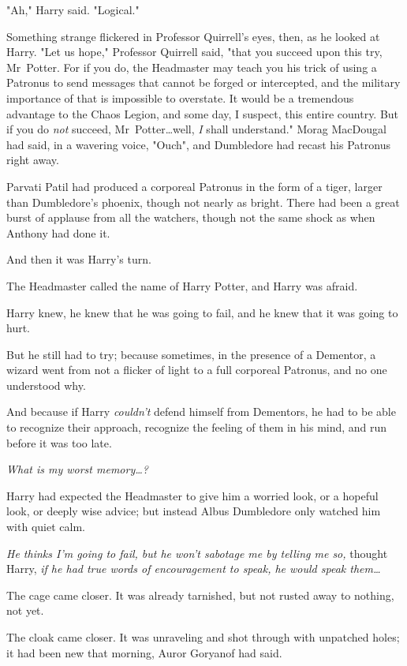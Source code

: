 "Ah," Harry said. "Logical."

Something strange flickered in Professor Quirrell's eyes, then, as he looked at
Harry. "Let us hope," Professor Quirrell said, "that you succeed upon this try,
Mr~Potter. For if you do, the Headmaster may teach you his trick of using a
Patronus to send messages that cannot be forged or intercepted, and the
military importance of that is impossible to overstate. It would be a
tremendous advantage to the Chaos Legion, and some day, I suspect, this entire
country. But if you do \emph{not} succeed, Mr~Potter…well, \emph{I}
shall understand."
\later
Morag MacDougal had said, in a wavering voice, "Ouch", and Dumbledore had
recast his Patronus right away.

Parvati Patil had produced a corporeal Patronus in the form of a tiger, larger
than Dumbledore's phoenix, though not nearly as bright. There had been a great
burst of applause from all the watchers, though not the same shock as when
Anthony had done it.

And then it was Harry's turn.

The Headmaster called the name of Harry Potter, and Harry was afraid.

Harry knew, he knew that he was going to fail, and he knew that it was going to
hurt.

But he still had to try; because sometimes, in the presence of a Dementor, a
wizard went from not a flicker of light to a full corporeal Patronus, and no
one understood why.

And because if Harry \emph{couldn't} defend himself from Dementors, he had to
be able to recognize their approach, recognize the feeling of them in his mind,
and run before it was too late.

\emph{What is my worst memory…?}

Harry had expected the Headmaster to give him a worried look, or a hopeful
look, or deeply wise advice; but instead Albus Dumbledore only watched him with
quiet calm.

\emph{He thinks I'm going to fail, but he won't sabotage me by telling me so,}
thought Harry, \emph{if he had true words of encouragement to speak, he would
speak them…}

The cage came closer. It was already tarnished, but not rusted away to nothing,
not yet.

The cloak came closer. It was unraveling and shot through with unpatched holes;
it had been new that morning, Auror Goryanof had said.

